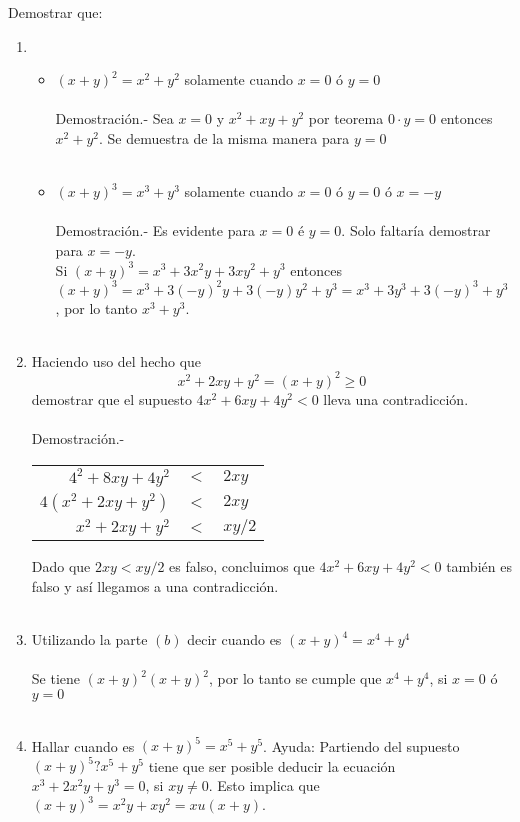 \begin{lema} Demostrar que:
\begin{enumerate}[\bfseries a)]
\item 
\begin{itemize}
\item $(x+y)^2=x^2+y^2$ solamente cuando $x=0$ ó $y=0$\\\\
Demostración.- \; Sea $x=0$ \; y \; $x^2+xy+y^2$ por teorema $0\cdot y = 0$ entonces $x^2+y^2$. Se demuestra de la misma manera para $y=0$\\\\
\item $(x+y)^3=x^3+y^3$ solamente cuando $x=0$ ó $y=0$ ó $x=-y$\\\\
Demostración.- \; Es evidente para $x=0$ é $y=0$. Solo faltaría demostrar para $x=-y$. \\ Si $(x+y)^3=x^3+3x^2y+3xy^2+y^3$ entonces $(x+y)^3=x^3 +3(-y)^2 y+3(-y)y^2 +y^3=x^3+3y^3+3(-y)^3+y^3$, por lo tanto $x^3+y^3$.\\\\ 
\end{itemize}
\item Haciendo uso del hecho que $$x^2+2xy+y^2=(x+y)^2 \geq 0$$
demostrar que el supuesto $4x^2 +6xy+4y^2<0$ lleva una contradicción.\\\\
Demostración.- \; 
\begin{center}
\begin{tabular}{r c l}
$4^2+8xy+4y^2$&$<$&$2xy$\\
$4(x^2+2xy+y^2)$&$<$&$2xy$\\
$x^2+2xy+y^2$&$<$&$xy/2$\\
\end{tabular}
\end{center}
Dado que $2xy<xy/2$ es falso, concluimos que $4x^2 +6xy+4y^2<0$ también es falso y así llegamos a una contradicción.\\\\
\item Utilizando la parte $(b)$ decir cuando es $(x+y)^4=x^4+y^4$\\\\
Se tiene $(x+y)^2(x+y)^2$, por lo tanto se cumple que $x^4+y^4$, si $x=0$ ó $y=0$\\\\
\item Hallar cuando es $(x+y)^5=x^5+y^5$. Ayuda: Partiendo del supuesto $(x+y)^5?x^5+y^5$ tiene que ser posible deducir la ecuación $x^3+2x^2y+y^3=0$, si $xy\neq 0$. Esto implica que $(x+y)^3=x^2y+xy^2=xu(x+y)$.\\

\end{enumerate}
\end{lema}

